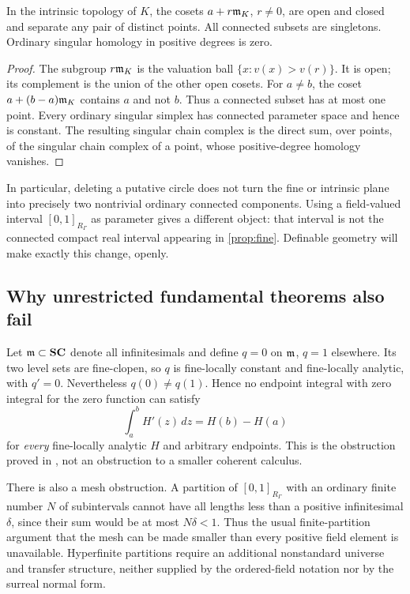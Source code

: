 \documentclass[11pt,letterpaper]{article}
\theoremstyle{definition}
\theoremstyle{remark}
\numberwithin{equation}{section}
\begin{document}
\begin{proposition}\label{prop:intrinsic}
In the intrinsic topology of $K$, the cosets $a+r\mathfrak m_K$, $r\ne0$, are open and closed and separate any pair of distinct points. All connected subsets are singletons. Ordinary singular homology in positive degrees is zero.
\end{proposition}
\begin{proof}
The subgroup $r\mathfrak m_K$ is the valuation ball $\{x:v(x)>v(r)\}$. It is open; its complement is the union of the other open cosets. For $a\ne b$, the coset $a+(b-a)\mathfrak m_K$ contains $a$ and not $b$. Thus a connected subset has at most one point. Every ordinary singular simplex has connected parameter space and hence is constant. The resulting singular chain complex is the direct sum, over points, of the singular chain complex of a point, whose positive-degree homology vanishes.
\end{proof}

In particular, deleting a putative circle does not turn the fine or intrinsic plane into precisely two nontrivial ordinary connected components. Using a field-valued interval $[0,1]_{R_\Gamma}$ as parameter gives a different object: that interval is not the connected compact real interval appearing in \cref{prop:fine}. Definable geometry will make exactly this change, openly.

\subsection{Why unrestricted fundamental theorems also fail}
Let $\mathfrak m\subset\mathbf{SC}$ denote all infinitesimals and define $q=0$ on $\mathfrak m$, $q=1$ elsewhere. Its two level sets are fine-clopen, so $q$ is fine-locally constant and fine-locally analytic, with $q'=0$. Nevertheless $q(0)\ne q(1)$. Hence no endpoint integral with zero integral for the zero function can satisfy
\[
 \int_a^b H'(z)\,dz=H(b)-H(a)
\]
for \emph{every} fine-locally analytic $H$ and arbitrary endpoints. This is the obstruction proved in \cite{Analysis}, not an obstruction to a smaller coherent calculus.

There is also a mesh obstruction. A partition of $[0,1]_{R_\Gamma}$ with an ordinary finite number $N$ of subintervals cannot have all lengths less than a positive infinitesimal $\delta$, since their sum would be at most $N\delta<1$. Thus the usual finite-partition argument that the mesh can be made smaller than every positive field element is unavailable. Hyperfinite partitions require an additional nonstandard universe and transfer structure, neither supplied by the ordered-field notation nor by the surreal normal form.
\end{document}
